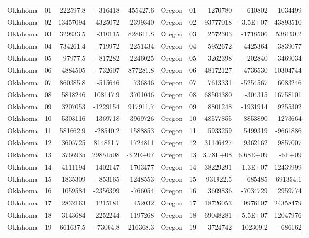\begin{landscape}
\begin{singlespace}
\begin{longtable}{lrrrr|lrrrr}
		Oklahoma &  01  & 222597.8 & -316418 & 455427.6 & Oregon &  01  & 1270780 & -610802 & 1034499 \\
		Oklahoma &  02  & 13457094 & -4325072 & 2399340 & Oregon &  02  & 93777018 & -3.5E+07 & 43893510 \\
		Oklahoma &  03  & 329933.5 & -310115 & 828611.8 & Oregon &  03  & 2572303 & -1718506 & 538150.2 \\
		Oklahoma &  04  & 734261.4 & -719972 & 2251434 & Oregon &  04  & 5952672 & -4425364 & 3839077 \\
		Oklahoma &  05  & -97977.5 & -817282 & 2246025 & Oregon &  05  & 3262398 & -202840 & -3469034 \\
		Oklahoma &  06  & 4884505 & -732607 & 877281.8 & Oregon &  06  & 48172127 & -4736530 & 10304744 \\
		Oklahoma &  07  & 860385.8 & -515646 & 736846 & Oregon &  07  & 7613331 & -5254567 & 6083246 \\
		Oklahoma &  08  & 5818246 & 108147.9 & 3701046 & Oregon &  08  & 68504380 & -304315 & 16758101 \\
		Oklahoma &  09  & 3207053 & -1229154 & 917911.7 & Oregon &  09  & 8801248 & -1931914 & 9255302 \\
		Oklahoma &  10 & 5303116 & 1369718 & 3969726 & Oregon &  10 & 48577855 & 8853890 & 1273664 \\
		Oklahoma &  11 & 581662.9 & -28540.2 & 1588853 & Oregon &  11 & 5933259 & 5499319 & -9661886 \\
		Oklahoma &  12 & 3605725 & 814881.7 & 1724811 & Oregon &  12 & 31146427 & 9362162 & 9857007 \\
		Oklahoma &  13 & 3766935 & 29851508 & -3.2E+07 & Oregon &  13 & 3.78E+08 & 6.68E+09 & -6E+09 \\
		Oklahoma &  14 & 4111194 & -1402147 & 1703477 & Oregon &  14 & 38229291 & -1.3E+07 & 12439999 \\
		Oklahoma &  15 & 1835309 & -853165 & 1248553 & Oregon &  15 & 931922.5 & -685485 & 691354.1 \\
		Oklahoma &  16 & 1059584 & -2356399 & -766054 & Oregon &  16 & 3609836 & -7034729 & 2959774 \\
		Oklahoma &  17 & 2832163 & -1215181 & -452032 & Oregon &  17 & 18726053 & -9976107 & 24358479 \\
		Oklahoma &  18 & 3143684 & -2252244 & 1197268 & Oregon &  18 & 69048281 & -5.5E+07 & 12047976 \\
		Oklahoma &  19 & 661637.5 & -73064.8 & 216368.3 & Oregon &  19 & 3724742 & 102309.2 & -686162 \\

\end{longtable}
\end{singlespace}
\end{landscape}

